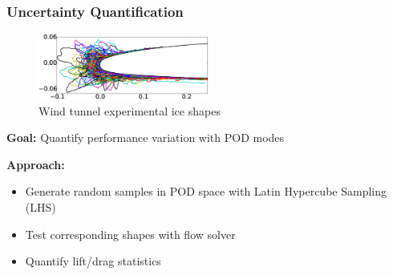 \documentclass[9pt]{beamer}
\begin{document}
\begin{frame}
\frametitle{Uncertainty Quantification}
\label{sec-3-10}

\vspace*{-0.0cm}\begin{figure}
      \includegraphics[width=0.5\textwidth]{GlobalDataSet}
      \caption{Wind tunnel experimental ice shapes}
\end{figure}
\textbf{Goal:} Quantify performance variation with POD modes

\textbf{Approach:}
\begin{itemize}
\item Generate random samples in POD space with Latin Hypercube Sampling (LHS)
\item Test corresponding shapes with flow solver
\item Quantify lift/drag statistics
\end{itemize}
\end{frame}
\end{document}

